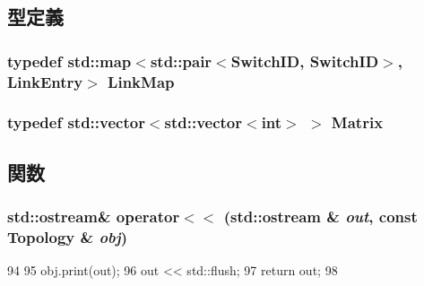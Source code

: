 \subsection{型定義}
\hypertarget{Topology_8hh_a4d8351b0e997e9522e41a5f481d9abfd}{
\subsubsection[{LinkMap}]{\setlength{\rightskip}{0pt plus 5cm}typedef std::map$<${\bf std::pair}$<${\bf SwitchID}, {\bf SwitchID}$>$, {\bf LinkEntry}$>$ {\bf LinkMap}}}
\label{Topology_8hh_a4d8351b0e997e9522e41a5f481d9abfd}
\hypertarget{Topology_8hh_ac482d2042aa01f64da22d39e9f469d8d}{
\subsubsection[{Matrix}]{\setlength{\rightskip}{0pt plus 5cm}typedef {\bf std::vector}$<${\bf std::vector}$<$int$>$ $>$ {\bf Matrix}}}
\label{Topology_8hh_ac482d2042aa01f64da22d39e9f469d8d}


\subsection{関数}
\hypertarget{Topology_8hh_a433a66045832859d10ca81b32bb53d63}{
\subsubsection[{operator$<$$<$}]{\setlength{\rightskip}{0pt plus 5cm}std::ostream\& operator$<$$<$ (std::ostream \& {\em out}, \/  const {\bf Topology} \& {\em obj})}}
\label{Topology_8hh_a433a66045832859d10ca81b32bb53d63}



\begin{DoxyCode}
94 {
95     obj.print(out);
96     out << std::flush;
97     return out;
98 }
\end{DoxyCode}
